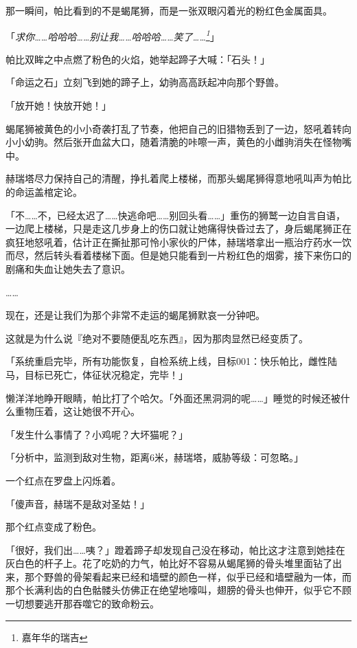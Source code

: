 那一瞬间，帕比看到的不是蝎尾狮，而是一张双眼闪着光的粉红色金属面具。

「\emph{求你……哈哈哈……别让我……哈哈哈……笑了……\footnote{嘉年华的瑞吉}}」

帕比双眸之中点燃了粉色的火焰，她举起蹄子大喊：「石头！」

「命运之石」立刻飞到她的蹄子上，幼驹高高跃起冲向那个野兽。

「放开她！快放开她！」

蝎尾狮被黄色的小小奇袭打乱了节奏，他把自己的旧猎物丢到了一边，怒吼着转向小小幼驹。然后张开血盆大口，随着清脆的咔嚓一声，黄色的小雌驹消失在怪物嘴中。

赫瑞塔尽力保持自己的清醒，挣扎着爬上楼梯，而那头蝎尾狮得意地吼叫声为帕比的命运盖棺定论。

「不……不，已经太迟了……快逃命吧……别回头看……」重伤的狮鹫一边自言自语，一边爬上楼梯，只是走这几步身上的伤口就让她痛得快昏过去了，身后蝎尾狮正在疯狂地怒吼着，估计正在撕扯那可怜小家伙的尸体，赫瑞塔拿出一瓶治疗药水一饮而尽，然后转头看着楼梯下面。但是她只能看到一片粉红色的烟雾，接下来伤口的剧痛和失血让她失去了意识。

……

现在，还是让我们为那个非常不走运的蝎尾狮默哀一分钟吧。

这就是为什么说『绝对不要随便乱吃东西』，因为那肉显然已经变质了。

\horizonline


「{\mt 系统重启完毕，所有功能恢复，自检系统上线，目标001：快乐帕比，雌性陆马，目标已死亡，体征状况稳定，完毕！}」

懒洋洋地睁开眼睛，帕比打了个哈欠。「外面还黑洞洞的呢……」睡觉的时候还被什么重物压着，这让她很不开心。

「发生什么事情了？小鸡呢？大坏猫呢？」

「{\mt 分析中，监测到敌对生物，距离6米，赫瑞塔，威胁等级：可忽略。}」

一个红点在罗盘上闪烁着。

「傻声音，赫瑞不是敌对圣姑！」

那个红点变成了粉色。

「很好，我们出……咦？」蹬着蹄子却发现自己没在移动，帕比这才注意到她挂在灰白色的杆子上。花了吃奶的力气，帕比好不容易从蝎尾狮的骨头堆里面钻了出来，那个野兽的骨架看起来已经和墙壁的颜色一样，似乎已经和墙壁融为一体，而那个长满利齿的白色骷髅头仿佛正在绝望地嚎叫，翅膀的骨头也伸开，似乎它不顾一切想要逃开那吞噬它的致命粉云。

